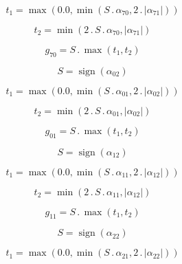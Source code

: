 \documentclass{article}
\begin{document}
\begin{dmath}t_{1} = \max\left(0.0, \min\left(S \,.\, \alpha_{70}, 2 \,.\, \left|{\alpha_{71}}\right|\right)\right)\end{dmath}

\begin{dmath}t_{2} = \min\left(2 \,.\, S \,.\, \alpha_{70}, \left|{\alpha_{71}}\right|\right)\end{dmath}

\begin{dmath}g_{70} = S \,.\, \max\left(t_{1}, t_{2}\right)\end{dmath}

\begin{dmath}S = \operatorname{sign}{\left (\alpha_{02} \right )}\end{dmath}

\begin{dmath}t_{1} = \max\left(0.0, \min\left(S \,.\, \alpha_{01}, 2 \,.\, \left|{\alpha_{02}}\right|\right)\right)\end{dmath}

\begin{dmath}t_{2} = \min\left(2 \,.\, S \,.\, \alpha_{01}, \left|{\alpha_{02}}\right|\right)\end{dmath}

\begin{dmath}g_{01} = S \,.\, \max\left(t_{1}, t_{2}\right)\end{dmath}

\begin{dmath}S = \operatorname{sign}{\left (\alpha_{12} \right )}\end{dmath}

\begin{dmath}t_{1} = \max\left(0.0, \min\left(S \,.\, \alpha_{11}, 2 \,.\, \left|{\alpha_{12}}\right|\right)\right)\end{dmath}

\begin{dmath}t_{2} = \min\left(2 \,.\, S \,.\, \alpha_{11}, \left|{\alpha_{12}}\right|\right)\end{dmath}

\begin{dmath}g_{11} = S \,.\, \max\left(t_{1}, t_{2}\right)\end{dmath}

\begin{dmath}S = \operatorname{sign}{\left (\alpha_{22} \right )}\end{dmath}

\begin{dmath}t_{1} = \max\left(0.0, \min\left(S \,.\, \alpha_{21}, 2 \,.\, \left|{\alpha_{22}}\right|\right)\right)\end{dmath}
\end{document}
